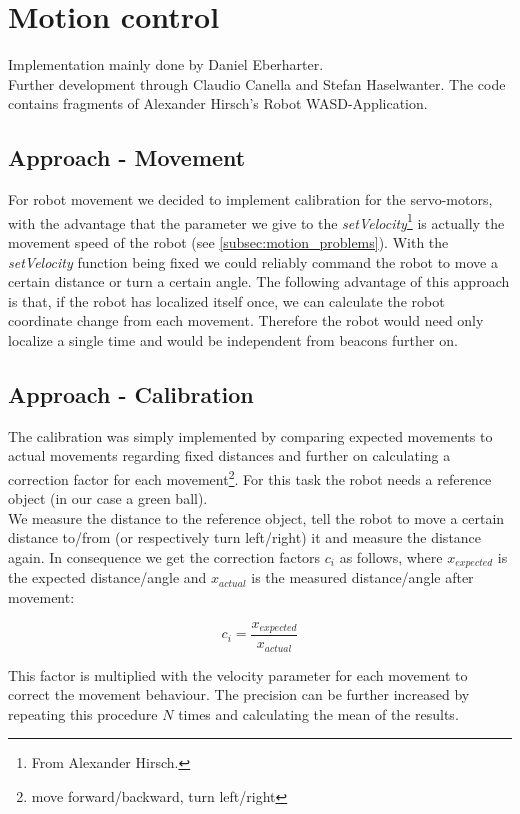 \documentclass[703031]{iisreport}
\begin{document}
\section{Motion control}
\label{sec:motion}
Implementation mainly done by Daniel Eberharter.\\
Further development through Claudio Canella and Stefan Haselwanter.
The code contains fragments of Alexander Hirsch's Robot WASD-Application.

\subsection{Approach - Movement}
For robot movement we decided to implement calibration for the servo-motors, with the advantage that the parameter we give to the \emph{setVelocity}\footnote{From Alexander Hirsch.} is 
actually the movement speed of the robot (see \ref{subsec:motion_problems}). With the \emph{setVelocity} function being fixed we could reliably command the robot to move a certain distance or turn a certain angle.
The following advantage of this approach is that, if the robot has localized itself once, we can calculate the robot coordinate change from each movement. Therefore the robot would need only localize a single time and would be independent from beacons further on.

\subsection{Approach - Calibration}
The calibration was simply implemented by comparing expected movements to actual movements regarding fixed distances and further on calculating a correction factor for each movement\footnote{move forward/backward, turn left/right}. For this task the robot needs a reference object (in our case a green ball). \\
We measure the distance to the reference object, tell the robot to move a certain distance to/from (or respectively turn left/right) it and measure the distance again. In consequence
we get the correction factors $c_i$ as follows, where $x_{expected}$ is the expected distance/angle and $x_{actual}$ is the measured distance/angle after movement:

	\[c_i = \frac{x_{expected}}{x_{actual}}\]

This factor is multiplied with the velocity parameter for each movement to correct the movement behaviour. The precision can be further increased by repeating this procedure $N$ times and calculating the mean of the results.
\end{document}

